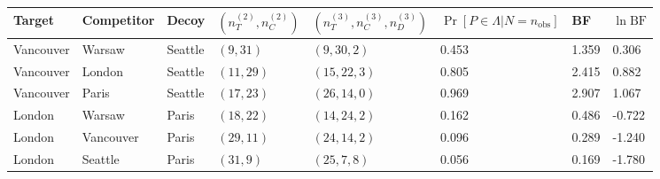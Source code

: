
\begin{tabular}{llllllll}
\toprule
Target & Competitor & Decoy & $(n_T^{(2)}, n_C^{(2)})$ & $(n_T^{(3)}, n_C^{(3)}, n_D^{(3)})$ & $\Pr[P \in \Lambda|N = n_{\mathrm{obs}}]$ & BF & $\ln \mathrm{BF}$\\
\midrule
Vancouver & Warsaw & Seattle & $(9,31)$ & $(9,30,2)$ & 0.453 & 1.359 & 0.306\\
Vancouver & London & Seattle & $(11,29)$ & $(15,22,3)$ & 0.805 & 2.415 & 0.882\\
Vancouver & Paris & Seattle & $(17,23)$ & $(26,14,0)$ & 0.969 & 2.907 & 1.067\\
London & Warsaw & Paris & $(18,22)$ & $(14,24,2)$ & 0.162 & 0.486 & -0.722\\
London & Vancouver & Paris & $(29,11)$ & $(24,14,2)$ & 0.096 & 0.289 & -1.240\\
\addlinespace
London & Seattle & Paris & $(31,9)$ & $(25,7,8)$ & 0.056 & 0.169 & -1.780\\
\bottomrule
\end{tabular}
